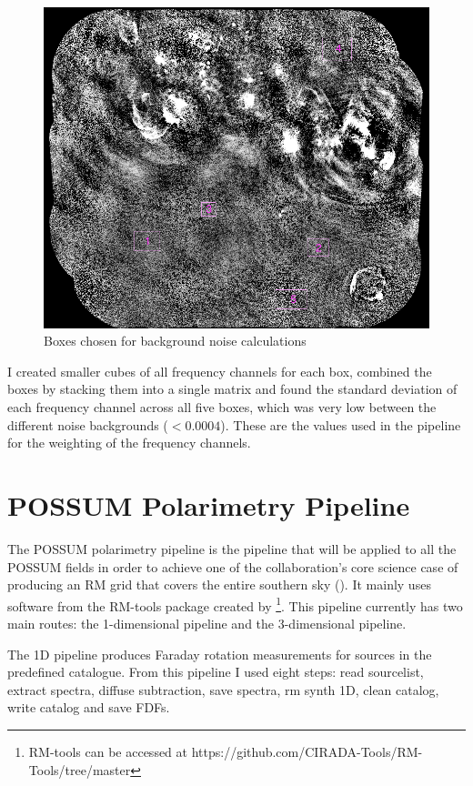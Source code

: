 \begin{figure}
    \centering
    \includegraphics[width=0.9\linewidth]{Thesis_Template/Figures/Boxes for noise calculation image.png}
    \caption{Boxes chosen for background noise calculations}
    \label{fig: background noise boxes}
\end{figure}

I created smaller cubes of all frequency channels for each box, combined the boxes by stacking them into a single matrix and found the standard deviation of each frequency channel across all five boxes, which was very low between the different noise backgrounds ($<0.0004$). These are the values used in the pipeline for the weighting of the frequency channels.


\section{POSSUM Polarimetry Pipeline}
\label{POSSUM pipeline 1d}
The POSSUM polarimetry pipeline is the pipeline that will be applied to all the POSSUM fields in order to achieve one of the collaboration's core science case of producing an RM grid that covers the entire southern sky (\cite{POSSUM}). It mainly uses software from the RM-tools package created by \cite{RMtools} \footnote{RM-tools can be accessed at https://github.com/CIRADA-Tools/RM-Tools/tree/master}. This pipeline currently has two main routes: the 1-dimensional pipeline and the 3-dimensional pipeline. 


The 1D pipeline produces Faraday rotation measurements for sources in the predefined catalogue. From this pipeline I used eight steps: read sourcelist, extract spectra, diffuse subtraction, save spectra, rm synth 1D, clean catalog, write catalog and save FDFs.

